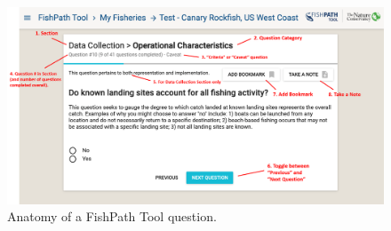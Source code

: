 \documentclass[
  11pt,
]{book}
\begin{document}
\begin{figure}
 
 {\centering \includegraphics[width=0.95\linewidth]{images/question-anatomy} 
 
 }
 
 \caption{Anatomy of a FishPath Tool question.}\label{fig:question-anatomy}
 \end{figure}
\end{document}
